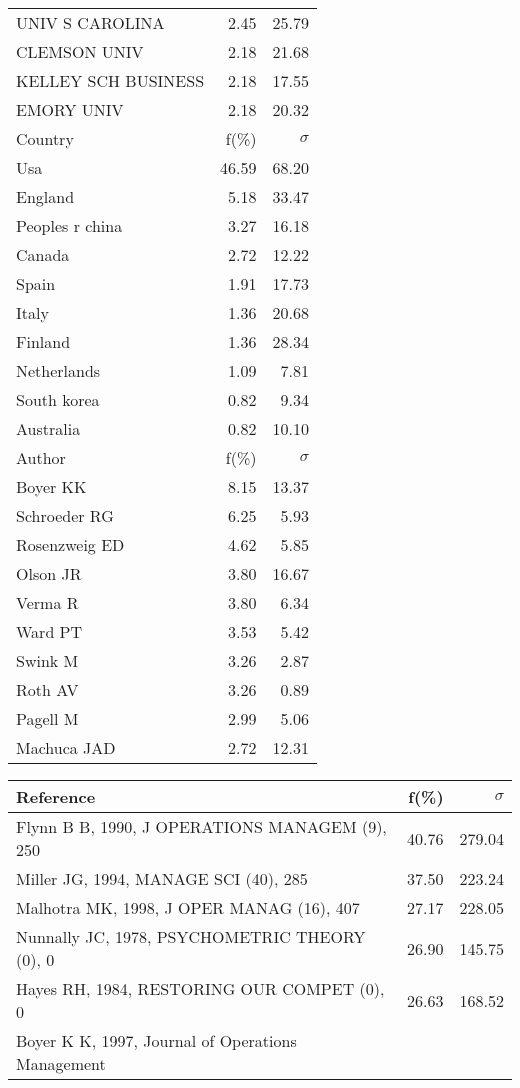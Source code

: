 \documentclass[a4paper,11pt]{report}
\begin{document}
\begin{landscape}
\begin{table}[!ht]
{\begin{tabular}{|l r r|}
UNIV S CAROLINA & 2.45 & 25.79\\
CLEMSON UNIV & 2.18 & 21.68\\
KELLEY SCH BUSINESS & 2.18 & 17.55\\
EMORY UNIV & 2.18 & 20.32\\
\hline
\hline
Country & f(\%) & $\sigma$\\
\hline
Usa & 46.59 & 68.20\\
England & 5.18 & 33.47\\
Peoples r china & 3.27 & 16.18\\
Canada & 2.72 & 12.22\\
Spain & 1.91 & 17.73\\
Italy & 1.36 & 20.68\\
Finland & 1.36 & 28.34\\
Netherlands & 1.09 & 7.81\\
South korea & 0.82 & 9.34\\
Australia & 0.82 & 10.10\\
\hline
\hline
Author & f(\%) & $\sigma$\\
\hline
Boyer KK & 8.15 & 13.37\\
Schroeder RG & 6.25 & 5.93\\
Rosenzweig ED & 4.62 & 5.85\\
Olson JR & 3.80 & 16.67\\
Verma R & 3.80 & 6.34\\
Ward PT & 3.53 & 5.42\\
Swink M & 3.26 & 2.87\\
Roth AV & 3.26 & 0.89\\
Pagell M & 2.99 & 5.06\\
Machuca JAD & 2.72 & 12.31\\
\hline
\end{tabular}
}
{\scriptsize\begin{tabular}{|l r r|}
\hline
Reference & f(\%) & $\sigma$\\
\hline
Flynn B B, 1990, J OPERATIONS MANAGEM (9), 250 & 40.76 & 279.04\\
Miller JG, 1994, MANAGE SCI (40), 285 & 37.50 & 223.24\\
Malhotra MK, 1998, J OPER MANAG (16), 407 & 27.17 & 228.05\\
Nunnally JC, 1978, PSYCHOMETRIC THEORY (0), 0 & 26.90 & 145.75\\
Hayes RH, 1984, RESTORING OUR COMPET (0), 0 & 26.63 & 168.52\\
Boyer K K, 1997, Journal of Operations Management &  & \\

\end{tabular}}
\end{table}
\end{landscape}
\end{document}

